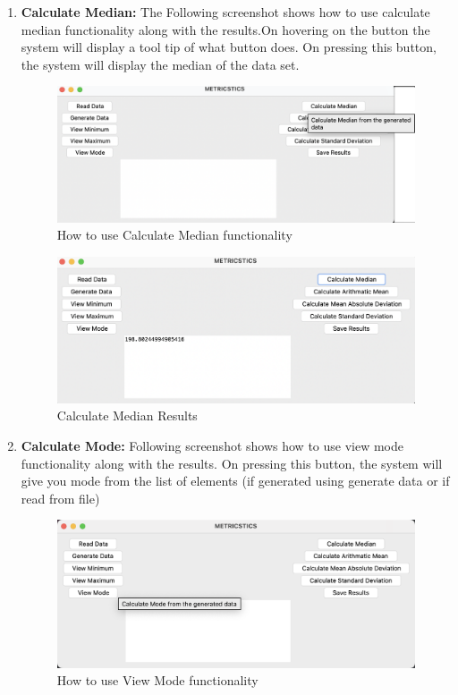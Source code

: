 \documentclass{article}
\begin{document}
\begin{enumerate}
    \item \textbf{Calculate Median:} The Following screenshot shows how to use calculate median functionality along with the results.On hovering on the button the system will display a tool tip of what button does. On pressing this button, the system will display the median of the data set.
    \begin{figure}[h]
        \centering
        \includegraphics[width=0.9\linewidth]{Calculate Median.png}
        \caption{How to use Calculate Median functionality}
    \end{figure}
    \vspace{20em}
    \begin{figure}[h]
        \centering
        \includegraphics[width=0.9\linewidth]{CalculateMedianResults.png}
        \caption{Calculate Median Results}
    \end{figure}

    \item \textbf{Calculate Mode:} Following screenshot shows how to use view mode functionality along with the results. On pressing this button, the system will give you mode from the list of elements (if generated using generate data or if read from file)

    \begin{figure}[h]
        \centering
        \includegraphics[width=0.9\linewidth]{ViewMode.png}
        \caption{How to use View Mode functionality}
    \end{figure}
    \vspace{20em}
    

\end{enumerate}
\end{document}
